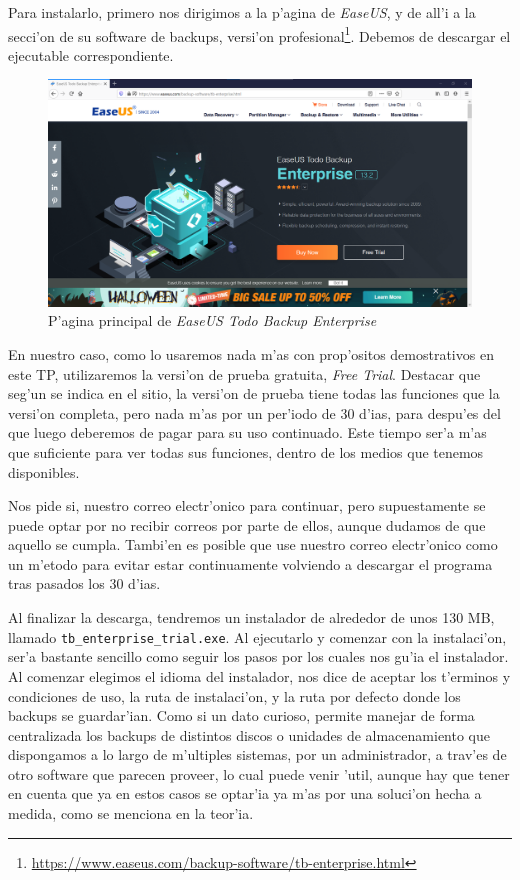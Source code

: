 \documentclass[11pt]{article}
\begin{document}
	Para instalarlo, primero nos dirigimos a la p'agina de \textit{EaseUS}, y de all'i a la secci'on de su software de backups, versi'on profesional\footnote{\url{https://www.easeus.com/backup-software/tb-enterprise.html}}. Debemos de descargar el ejecutable correspondiente.
	
	\begin{figure}[H]
		\centering
		\includegraphics[width=.8\textwidth]{Images/easeus/website}
		\caption{P'agina principal de \textit{EaseUS Todo Backup Enterprise}}
	\end{figure}
	
	En nuestro caso, como lo usaremos nada m'as con prop'ositos demostrativos en este TP, utilizaremos la versi'on de prueba gratuita, \textit{Free Trial}. Destacar que seg'un se indica en el sitio, la versi'on de prueba tiene todas las funciones que la versi'on completa, pero nada m'as por un per'iodo de 30 d'ias, para despu'es del que luego deberemos de pagar para su uso continuado. Este tiempo ser'a m'as que suficiente para ver todas sus funciones, dentro de los medios que tenemos disponibles. 
	
	Nos pide si, nuestro correo electr'onico para continuar, pero supuestamente se puede optar por no recibir correos por parte de ellos, aunque dudamos de que aquello se cumpla. Tambi'en es posible que use nuestro correo electr'onico como un m'etodo para evitar estar continuamente volviendo a descargar el programa tras pasados los 30 d'ias.
	
	Al finalizar la descarga, tendremos un instalador de alrededor de unos 130 MB, llamado \texttt{tb\_enterprise\_trial.exe}. Al ejecutarlo y comenzar con la instalaci'on, ser'a bastante sencillo como seguir los pasos por los cuales nos gu'ia el instalador. Al comenzar elegimos el idioma del instalador, nos dice de aceptar los t'erminos y condiciones de uso, la ruta de instalaci'on, y la ruta por defecto donde los backups se guardar'ian. Como si un dato curioso, permite manejar de forma centralizada los backups de distintos discos o unidades de almacenamiento que dispongamos a lo largo de m'ultiples sistemas, por un administrador, a trav'es de otro software que parecen proveer,  lo cual puede venir 'util, aunque hay que tener en cuenta que ya en estos casos se optar'ia ya m'as por una soluci'on hecha a medida, como se menciona en la teor'ia.
	
\end{document}
